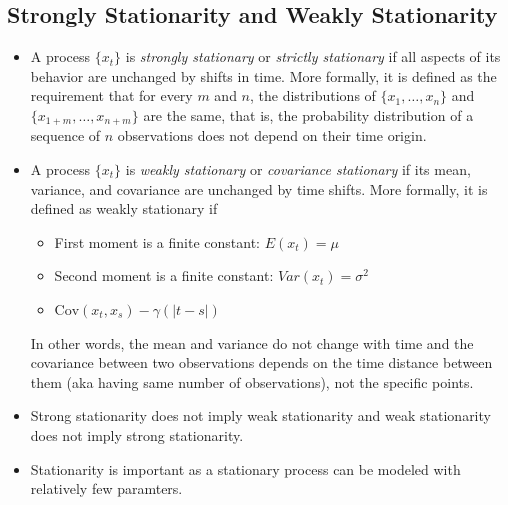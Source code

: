 \documentclass[11pt]{article}
\begin{document}
\subsection{Strongly Stationarity and Weakly Stationarity}
\begin{itemize}
    \item A process $\{x_t\}$ is \textit{strongly stationary} or \textit{strictly stationary}
    if all aspects of its behavior are unchanged by shifts in time. More formally, it is
    defined as the requirement that for every $m$ and $n$, the distributions of $\{x_1, \ldots,
    x_n\}$ and $\{x_{1+m}, \ldots, x_{n+m}\}$ are the same, that is, the probability 
    distribution of a sequence of $n$ observations does not depend on their time origin.
   \item A process $\{x_t\}$ is \textit{weakly stationary} or \textit{covariance stationary} if 
   its mean, variance, and covariance are unchanged by time shifts. More formally, it is 
   defined as weakly stationary if 
   \begin{itemize}
    \item First moment is a finite constant: $E(x_t) = \mu$
    \item Second moment is a finite constant: $Var(x_t) = \sigma^2$
    \item $\text{Cov}(x_t, x_s) - \gamma(|t-s|)$
   \end{itemize}
   In other words, the mean and variance do not change with time and the covariance between 
   two observations depends on the time distance between them (aka having same number of 
   observations), not the specific points. 
   \item Strong stationarity does not imply weak stationarity and weak stationarity does not 
   imply strong stationarity.    
   \item Stationarity is important as a stationary process can be modeled with relatively few 
   paramters.
\end{itemize}
\end{document}
